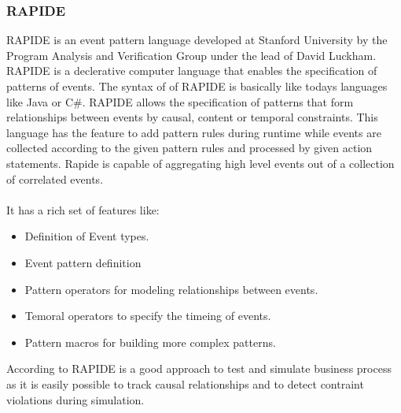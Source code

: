 \documentclass[a4paper,titlepage,11pt,DIV10,BCOR0.5cm,headinclude]{article}
\begin{document}
\subsubsection{RAPIDE}
RAPIDE is an event pattern language developed at Stanford University by the Program Analysis and Verification Group under the lead of David Luckham. RAPIDE is a declerative computer language that enables the specification of patterns of events. The syntax of of RAPIDE is basically like todays languages like Java or C\#. RAPIDE allows the specification of patterns that form relationships between events by causal, content or temporal constraints. This language has the feature to add pattern rules during runtime while events are collected according to the given pattern rules and processed by given action statements. Rapide is capable of aggregating high level events out of a collection of correlated events.
\\\\
It has a rich set of features \cite{Luckham05} like:

\begin{itemize}
	\item Definition of Event types.
	\item Event pattern definition
	\item Pattern operators for modeling relationships between events.
	\item Temoral operators to specify the timeing of events.
	\item Pattern macros for building more complex patterns.
\end{itemize}

According to \cite{LuckhamManensPark} RAPIDE is a good approach to test and simulate business process as it is easily possible to track causal relationships and to detect contraint violations during simulation. 

\end{document}
